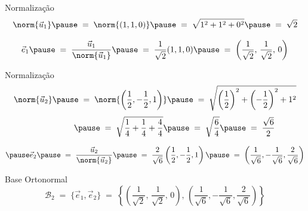 \begin{resolution}{Normalização}
  \[
    \norm{\vec{u}_1}
    \pause
    \;=\; \norm{(1, 1, 0)}
    \pause
    \;=\; \sqrt{1^2 + 1^2 + 0^2}
    \pause
    \;=\; \sqrt{2}
  \]

  \pause
  \bigskip
  \[
    \vec{e}_1
    \pause
    \;=\; \frac{\vec{u}_1}{\norm{\vec{u}_1}}
    \pause
    \;=\; \frac{1}{\sqrt{2}}(1, 1, 0)
    \pause
    \;=\; \left(\frac{1}{\sqrt{2}}, \, \frac{1}{\sqrt{2}},\, 0 \right)
  \]
\end{resolution}

\begin{resolution}{Normalização}
  \[
    \norm{\vec{u}_2}
    \pause
    \;=\; \norm{\left( \frac{1}{2}, -\frac{1}{2}, 1 \right)}
    \pause
    \;=\; \sqrt{\left(\frac{1}{2}\right)^2 + \left(-\frac{1}{2}\right)^2 + 1^2}
  \]
  \[
    \hphantom{\norm{\vec{u}_2}}
    \pause
    \;=\; \sqrt{\frac{1}{4} + \frac{1}{4} + \frac{4}{4}}
    \pause
    \;=\; \sqrt{\frac{6}{4}}
    \pause
    \;=\; \frac{\sqrt{6}}{2}
  \]

  \bigskip
  \[
    \pause
    \vec{e}_2
    \pause
    \;=\; \frac{\vec{u}_2}{\norm{\vec{u}_2}}
    \pause
    \;=\; \frac{2}{\sqrt{6}} \left( \frac{1}{2}, -\frac{1}{2}, 1 \right)
    \pause
    \;=\; \left( \frac{1}{\sqrt{6}}, -\frac{1}{\sqrt{6}}, \frac{2}{\sqrt{6}} \right)
  \]
\end{resolution}

\begin{resolution}{Base Ortonormal}
  \[
    \mathcal{B}_2
    \;=\; \{ \vec{e}_1, \vec{e}_2 \}
    \;=\; \left\{
      \left(\frac{1}{\sqrt{2}}, \, \frac{1}{\sqrt{2}},\, 0 \right), \,
      \left( \frac{1}{\sqrt{6}}, -\frac{1}{\sqrt{6}}, \frac{2}{\sqrt{6}} \right)
    \right\}
  \]
\end{resolution}

\endinput
